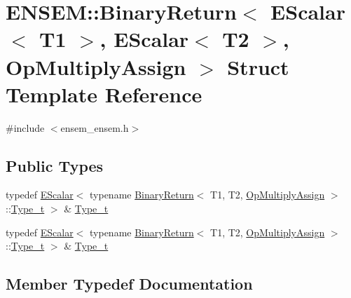\hypertarget{structENSEM_1_1BinaryReturn_3_01EScalar_3_01T1_01_4_00_01EScalar_3_01T2_01_4_00_01OpMultiplyAssign_01_4}{}\section{E\+N\+S\+EM\+:\+:Binary\+Return$<$ E\+Scalar$<$ T1 $>$, E\+Scalar$<$ T2 $>$, Op\+Multiply\+Assign $>$ Struct Template Reference}
\label{structENSEM_1_1BinaryReturn_3_01EScalar_3_01T1_01_4_00_01EScalar_3_01T2_01_4_00_01OpMultiplyAssign_01_4}


{\ttfamily \#include $<$ensem\+\_\+ensem.\+h$>$}

\subsection*{Public Types}
\begin{DoxyCompactItemize}
\item 
typedef \mbox{\hyperlink{classENSEM_1_1EScalar}{E\+Scalar}}$<$ typename \mbox{\hyperlink{structENSEM_1_1BinaryReturn}{Binary\+Return}}$<$ T1, T2, \mbox{\hyperlink{structENSEM_1_1OpMultiplyAssign}{Op\+Multiply\+Assign}} $>$\+::\mbox{\hyperlink{structENSEM_1_1BinaryReturn_3_01EScalar_3_01T1_01_4_00_01EScalar_3_01T2_01_4_00_01OpMultiplyAssign_01_4_a2f77c1c4166c0bd97216ba05e9c89291}{Type\+\_\+t}} $>$ \& \mbox{\hyperlink{structENSEM_1_1BinaryReturn_3_01EScalar_3_01T1_01_4_00_01EScalar_3_01T2_01_4_00_01OpMultiplyAssign_01_4_a2f77c1c4166c0bd97216ba05e9c89291}{Type\+\_\+t}}
\item 
typedef \mbox{\hyperlink{classENSEM_1_1EScalar}{E\+Scalar}}$<$ typename \mbox{\hyperlink{structENSEM_1_1BinaryReturn}{Binary\+Return}}$<$ T1, T2, \mbox{\hyperlink{structENSEM_1_1OpMultiplyAssign}{Op\+Multiply\+Assign}} $>$\+::\mbox{\hyperlink{structENSEM_1_1BinaryReturn_3_01EScalar_3_01T1_01_4_00_01EScalar_3_01T2_01_4_00_01OpMultiplyAssign_01_4_a2f77c1c4166c0bd97216ba05e9c89291}{Type\+\_\+t}} $>$ \& \mbox{\hyperlink{structENSEM_1_1BinaryReturn_3_01EScalar_3_01T1_01_4_00_01EScalar_3_01T2_01_4_00_01OpMultiplyAssign_01_4_a2f77c1c4166c0bd97216ba05e9c89291}{Type\+\_\+t}}
\end{DoxyCompactItemize}


\subsection{Member Typedef Documentation}
\mbox{\label{structENSEM_1_1BinaryReturn_3_01EScalar_3_01T1_01_4_00_01EScalar_3_01T2_01_4_00_01OpMultiplyAssign_01_4_a2f77c1c4166c0bd97216ba05e9c89291}} 
